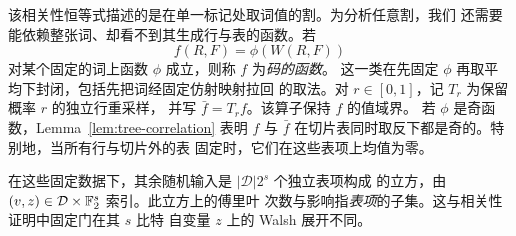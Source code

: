 该相关性恒等式描述的是在单一标记处取词值的割。为分析任意割，我们
还需要能依赖整张词、却看不到其生成行与表的函数。若
\begin{equation}
 f(R,F)=\phi(W(R,F))
 \label{eq:function-of-code}
\end{equation}
对某个固定的词上函数 $\phi$ 成立，则称 $f$ 为\emph{码的函数}。
这一类在先固定 $\phi$ 再取平均下封闭，包括先把词经固定仿射映射拉回
的取法。对 $r\in[0,1]$，记 $T_r$ 为保留概率 $r$ 的独立行重采样，
并写 $\bar f=T_rf$。该算子保持 $f$ 的值域界。
若 $\phi$ 是奇函数，Lemma~\ref{lem:tree-correlation} 表明 $f$ 与
$\bar f$ 在切片表同时取反下都是奇的。特别地，当所有行与切片外的表
固定时，它们在这些表项上均值为零。

在这些固定数据下，其余随机输入是 $|\mathcal D|2^s$ 个独立表项构成
的立方，由 $(v,z)\in\mathcal D\times\mathbb F_2^s$ 索引。此立方上的傅里叶
次数与影响指\emph{表项}的子集。这与相关性证明中固定门在其 $s$ 比特
自变量 $z$ 上的 Walsh 展开不同。
